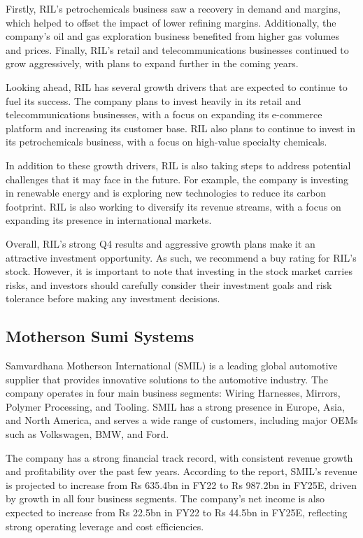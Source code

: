Firstly, RIL's petrochemicals business saw a recovery in demand and margins, which helped to offset the impact of lower refining margins. Additionally, the company's oil and gas exploration business benefited from higher gas volumes and prices. Finally, RIL's retail and telecommunications businesses continued to grow aggressively, with plans to expand further in the coming years.

Looking ahead, RIL has several growth drivers that are expected to continue to fuel its success. The company plans to invest heavily in its retail and telecommunications businesses, with a focus on expanding its e-commerce platform and increasing its customer base. RIL also plans to continue to invest in its petrochemicals business, with a focus on high-value specialty chemicals.

In addition to these growth drivers, RIL is also taking steps to address potential challenges that it may face in the future. For example, the company is investing in renewable energy and is exploring new technologies to reduce its carbon footprint. RIL is also working to diversify its revenue streams, with a focus on expanding its presence in international markets.

Overall, RIL's strong Q4 results and aggressive growth plans make it an attractive investment opportunity. As such, we recommend a buy rating for RIL's stock. However, it is important to note that investing in the stock market carries risks, and investors should carefully consider their investment goals and risk tolerance before making any investment decisions.

    \subsection{Motherson Sumi Systems} Samvardhana Motherson International (SMIL) is a leading global automotive supplier that provides innovative solutions to the automotive industry. The company operates in four main business segments: Wiring Harnesses, Mirrors, Polymer Processing, and Tooling. SMIL has a strong presence in Europe, Asia, and North America, and serves a wide range of customers, including major OEMs such as Volkswagen, BMW, and Ford.

The company has a strong financial track record, with consistent revenue growth and profitability over the past few years. According to the report, SMIL's revenue is projected to increase from Rs 635.4bn in FY22 to Rs 987.2bn in FY25E, driven by growth in all four business segments. The company's net income is also expected to increase from Rs 22.5bn in FY22 to Rs 44.5bn in FY25E, reflecting strong operating leverage and cost efficiencies.

